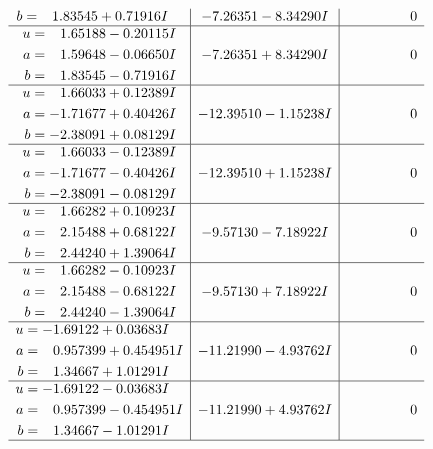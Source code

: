 \documentclass[1p]{elsarticle_modified}
\theoremstyle{definition}
\begin{document}
$$\begin{array}{c|c|c}
\begin{aligned}
b &= \phantom{-}1.83545 + 0.71916 I\end{aligned}
 & -7.26351 - 8.34290 I & \phantom{-0.000000 } 0 \\ \hline\begin{aligned}
u &= \phantom{-}1.65188 - 0.20115 I \\
a &= \phantom{-}1.59648 - 0.06650 I \\
b &= \phantom{-}1.83545 - 0.71916 I\end{aligned}
 & -7.26351 + 8.34290 I & \phantom{-0.000000 } 0 \\ \hline\begin{aligned}
u &= \phantom{-}1.66033 + 0.12389 I \\
a &= -1.71677 + 0.40426 I \\
b &= -2.38091 + 0.08129 I\end{aligned}
 & -12.39510 - 1.15238 I & \phantom{-0.000000 } 0 \\ \hline\begin{aligned}
u &= \phantom{-}1.66033 - 0.12389 I \\
a &= -1.71677 - 0.40426 I \\
b &= -2.38091 - 0.08129 I\end{aligned}
 & -12.39510 + 1.15238 I & \phantom{-0.000000 } 0 \\ \hline\begin{aligned}
u &= \phantom{-}1.66282 + 0.10923 I \\
a &= \phantom{-}2.15488 + 0.68122 I \\
b &= \phantom{-}2.44240 + 1.39064 I\end{aligned}
 & -9.57130 - 7.18922 I & \phantom{-0.000000 } 0 \\ \hline\begin{aligned}
u &= \phantom{-}1.66282 - 0.10923 I \\
a &= \phantom{-}2.15488 - 0.68122 I \\
b &= \phantom{-}2.44240 - 1.39064 I\end{aligned}
 & -9.57130 + 7.18922 I & \phantom{-0.000000 } 0 \\ \hline\begin{aligned}
u &= -1.69122 + 0.03683 I \\
a &= \phantom{-}0.957399 + 0.454951 I \\
b &= \phantom{-}1.34667 + 1.01291 I\end{aligned}
 & -11.21990 - 4.93762 I & \phantom{-0.000000 } 0 \\ \hline\begin{aligned}
u &= -1.69122 - 0.03683 I \\
a &= \phantom{-}0.957399 - 0.454951 I \\
b &= \phantom{-}1.34667 - 1.01291 I\end{aligned}
 & -11.21990 + 4.93762 I & \phantom{-0.000000 } 0\\
 \hline 
 \end{array}$$\newpage\newpage\renewcommand{\arraystretch}{1}
\end{document}
